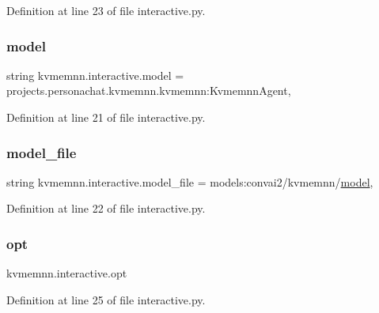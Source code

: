Definition at line 23 of file interactive.\+py.

\mbox{\label{namespacekvmemnn_1_1interactive_ab9d849f42c9dc80add1b29544632509d}} 
\subsubsection{\texorpdfstring{model}{model}}
{\footnotesize\ttfamily string kvmemnn.\+interactive.\+model = \textquotesingle{}projects.\+personachat.\+kvmemnn.\+kvmemnn\+:\+Kvmemnn\+Agent\textquotesingle{},}



Definition at line 21 of file interactive.\+py.

\mbox{\label{namespacekvmemnn_1_1interactive_a80e00de932e397d20d6c101c01a46ba3}} 
\subsubsection{\texorpdfstring{model\+\_\+file}{model\_file}}
{\footnotesize\ttfamily string kvmemnn.\+interactive.\+model\+\_\+file = \textquotesingle{}models\+:convai2/kvmemnn/\hyperlink{namespacekvmemnn_1_1interactive_ab9d849f42c9dc80add1b29544632509d}{model}\textquotesingle{},}



Definition at line 22 of file interactive.\+py.

\mbox{\label{namespacekvmemnn_1_1interactive_a70f6d84eb79dac9243d23588351c6351}} 
\subsubsection{\texorpdfstring{opt}{opt}}
{\footnotesize\ttfamily kvmemnn.\+interactive.\+opt}



Definition at line 25 of file interactive.\+py.

